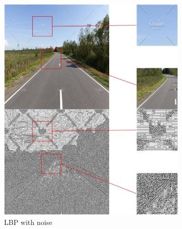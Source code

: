 \documentclass[a4paper, 10pt]{article}
\begin{document}
	\begin{figure}[htbp] 
		\centering 
		
		\begin{subfigure}{0.3\textwidth}
			\includegraphics[width=\linewidth]{picture/LBP noise}
			\caption{LBP with noise}
			\label{fig: LBP noise}	
		\end{subfigure}
		\begin{subfigure}{0.3\textwidth}

\end{subfigure}
\end{figure}
\end{document}
